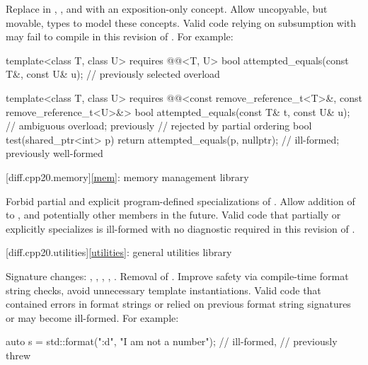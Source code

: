 \change
Replace  in ,
, and 
with an exposition-only concept.
\rationale
Allow uncopyable, but movable, types to model these concepts.
\effect
Valid \CppXX{} code relying on subsumption
with 
may fail to compile in this revision of \Cpp{}.
For example:
\begin{codeblock}
template<class T, class U>
  requires @@<T, U>
bool attempted_equals(const T&, const U& u);    // previously selected overload

template<class T, class U>
  requires @@<const remove_reference_t<T>&, const remove_reference_t<U>&>
bool attempted_equals(const T& t, const U& u);  // ambiguous overload; previously
                                                // rejected by partial ordering
bool test(shared_ptr<int> p) {
  return attempted_equals(p, nullptr);          // ill-formed; previously well-formed
}
\end{codeblock}

[diff.cpp20.memory]{\ref{mem}: memory management library}

\change
Forbid partial and explicit program-defined specializations
of .
\rationale
Allow addition of  to ,
and potentially other members in the future.
\effect
Valid \CppXX{} code
that partially or explicitly specializes 
is ill-formed with no diagnostic required in this revision of \Cpp{}.

[diff.cpp20.utilities]{\ref{utilities}: general utilities library}

\change
Signature changes: , , ,
, .
Removal of .
\rationale
Improve safety via compile-time format string checks,
avoid unnecessary template instantiations.
\effect
Valid \CppXX{} code that
contained errors in format strings or
relied on previous format string signatures or
 may become ill-formed.
For example:
\begin{codeblock}
auto s = std::format("{:d}", "I am not a number");      // ill-formed,
                                                        // previously threw 
\end{codeblock}

